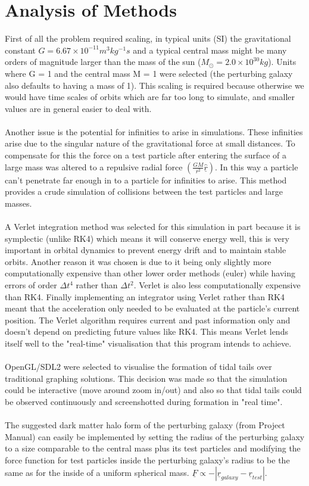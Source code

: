 \documentclass[10pt,a4paper]{article}
\begin{document}
\section{Analysis of Methods}
First of all the problem required scaling, in typical units (SI) the gravitational constant $G=6.67\times10^{-11} m^3 kg^{-1} s$ and a typical central mass might be many orders of magnitude larger than the mass of the sun ($M_\odot=2.0\times10^{30 } kg$). Units where G = 1 and the central mass M = 1 were selected (the perturbing galaxy also defaults to having a mass of 1). This scaling is required because otherwise we would have time scales of orbits which are far too long to simulate, and smaller values are in general easier to deal with.
\\
\\
Another issue is the potential for infinities to arise in simulations. These infinities arise due to the singular nature of the gravitational force at small distances. To compensate for this the force on a test particle after entering the surface of a large mass was altered to a repulsive radial force $(\frac{GM}{r^2} \underline{\hat{r}})$. In this way a particle can't penetrate far enough in to a particle for infinities to arise. This method provides a crude simulation of collisions between the test particles and large masses.
\\
\\
A Verlet integration method was selected for this simulation in part because it is symplectic (unlike RK4) which means it will conserve energy well, this is very important in orbital dynamics to prevent energy drift and to maintain stable orbits. Another reason it was chosen is due to it being only slightly more computationally expensive than other lower order methods (euler) while having errors of order $\Delta t^4$ rather than $\Delta t^2$. Verlet is also less computationally expensive than RK4. Finally implementing an integrator using Verlet rather than RK4 meant that the acceleration only needed to be evaluated at the particle's current position. The Verlet algorithm requires current and past information only and doesn't depend on predicting future values like RK4. This means Verlet lends itself well to the "real-time" visualisation that this program intends to achieve.
\\
\\
OpenGL/SDL2 were selected to visualise the formation of tidal tails over traditional graphing solutions. This decision was made so that the simulation could be interactive (move around zoom in/out) and also so that tidal tails could be observed continuously and screenshotted during formation in "real time".
\\
\\
The suggested dark matter halo form of the perturbing galaxy (from Project Manual) can easily be implemented by setting the radius of the perturbing galaxy to a size comparable to the central mass plus its test particles and modifying the force function for test particles inside the perturbing galaxy's radius to be the same as for the inside of a uniform spherical mass. $\underline{F} \propto -|\underline{r}_{galaxy}-\underline{r}_{test}|$.
\clearpage
\end{document}
